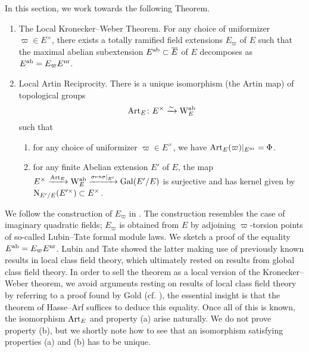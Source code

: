 \documentclass[../main.tex]{subfiles}
\begin{document}
In this section, we work towards the following Theorem.

\begin{thm}\label{thm:LocalKroneckerWeber} \leavevmode
  \vspace{-0.5em}
  \begin{enumerate}
    \item \textnormal{The Local Kronecker--Weber Theorem.} For any choice of uniformizer $\varpi \in E^\times$, there exists a 
      totally ramified field extensions $E_\varpi$ of $E$ such that 
      the maximal abelian subextension $E^{\mathrm{ab}} \subset \overline E$ of $E$
      decomposes as $E^{\mathrm{ab}} = E_\varpi E^{\mathrm{nr}}$.     
    \item \textnormal{Local Artin Reciprocity.} There is a unique isomorphism
      (the Artin map) of topological groups
      \begin{equation*}
        \mathrm{Art}_E\colon E^\times \xrightarrow{\sim} \mathrm W_E^{\mathrm{ab}}
      \end{equation*}
      such that 
      \begin{enumerate}
        \item for any choice of uniformizer $\varpi \in E^\times$, we have
          $\mathrm{Art}_E(\varpi)|_{E^{\mathrm{nr}}} = \Phi$.
        \item for any finite Abelian extension $E'$ of $E$, the
          map $E^\times \xrightarrow{\mathrm{Art}_E} \mathrm W_E^{\mathrm{ab}} \xrightarrow{\sigma \mapsto
          \sigma|_{E'}} \operatorname{Gal}(E'/E)$ is surjective and has kernel given by
          $\mathrm{N}_{E'/E}(E'^\times) \subset E^\times$. 
      \end{enumerate}
  \end{enumerate}
\end{thm}

We follow the construction of $E_\varpi$ in \cite{LubinTateFormalMult}.
The construction resembles the case of imaginary quadratic fields; $E_\varpi$ is
obtained from $E$ by adjoining $\varpi$-torsion points of so-called Lubin--Tate
formal module laws. 
We sketch a proof of the equality $E^{\mathrm{ab}} = E_\varpi E^{\mathrm{nr}}$. Lubin and Tate
showed the latter
making use of previously known results in local class field theory, which ultimately
rested on results from global class field theory. 
In order to sell the theorem as a
local version of the Kronecker--Weber theorem,
we avoid arguments resting on results of local class field theory
by referring to a proof found by Gold (cf.
\cite{gold1981local}), the essential insight is that the theorem of Hasse--Arf
suffices to deduce this equality. 
Once all of this is known, the isomorphism $\mathrm{Art}_E$ and property
(a) arise naturally. We do not prove property (b), but we shortly note how to see
that an isomorphism satisfying properties (a) and (b) has to be unique.
\end{document}
